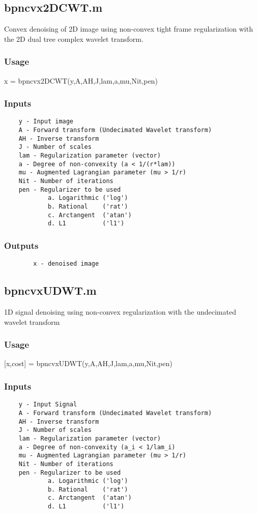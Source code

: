 \documentclass[11pt]{article}
\begin{document}
\subsection{bp\textunderscore ncvx2DCWT.m}
Convex denoising of 2D image using non-convex tight frame regularization with the 2D dual tree complex wavelet transform. 
\subsubsection{Usage}
x = bp\textunderscore ncvx2DCWT(y,A,AH,J,lam,a,mu,Nit,pen)
\subsubsection{Inputs}
\begin{verbatim}
    y - Input image
    A - Forward transform (Undecimated Wavelet transform)
    AH - Inverse transform
    J - Number of scales
    lam - Regularization parameter (vector)
    a - Degree of non-convexity (a < 1/(r*lam))
    mu - Augmented Lagrangian parameter (mu > 1/r)
    Nit - Number of iterations
    pen - Regularizer to be used 
            a. Logarithmic ('log')
            b. Rational    ('rat')
            c. Arctangent  ('atan')
            d. L1          ('l1')
\end{verbatim}

\subsubsection{Outputs}
\begin{verbatim}
    	x - denoised image
\end{verbatim}

\subsection{bp\textunderscore ncvxUDWT.m}
1D signal denoising using non-convex regularization with the undecimated wavelet transform
\subsubsection{Usage}
[x,cost] = bp\textunderscore ncvxUDWT(y,A,AH,J,lam,a,mu,Nit,pen)
\subsubsection{Inputs}
\begin{verbatim}
    y - Input Signal
    A - Forward transform (Undecimated Wavelet transform)
    AH - Inverse transform
    J - Number of scales
    lam - Regularization parameter (vector)
    a - Degree of non-convexity (a_i < 1/lam_i)
    mu - Augmented Lagrangian parameter (mu > 1/r)
    Nit - Number of iterations
    pen - Regularizer to be used 
            a. Logarithmic ('log')
            b. Rational    ('rat')
            c. Arctangent  ('atan')
            d. L1          ('l1')
\end{verbatim}
\end{document}
